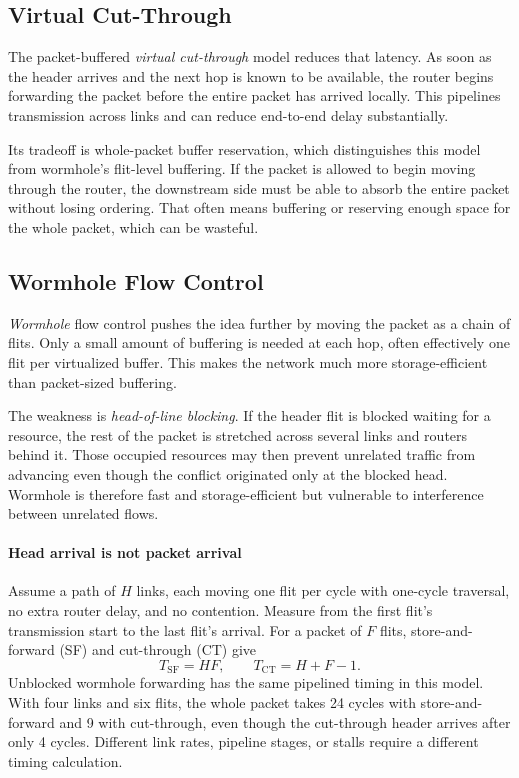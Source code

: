 \subsection{Virtual Cut-Through}\label{subsec:pin-cut-through}
The packet-buffered \textit{virtual cut-through} model reduces that latency.
As soon as the header arrives and the next hop is known to be available, the router begins forwarding the packet before the entire packet has arrived locally.
This pipelines transmission across links and can reduce end-to-end delay substantially.

Its tradeoff is whole-packet buffer reservation, which distinguishes this model from wormhole's flit-level buffering.
If the packet is allowed to begin moving through the router, the downstream side must be able to absorb the entire packet without losing ordering.
That often means buffering or reserving enough space for the whole packet, which can be wasteful.

\subsection{Wormhole Flow Control}\label{subsec:pin-wormhole}
\textit{Wormhole} flow control pushes the idea further by moving the packet as a chain of flits.
Only a small amount of buffering is needed at each hop, often effectively one flit per virtualized buffer.
This makes the network much more storage-efficient than packet-sized buffering.

The weakness is \textit{head-of-line blocking}.
If the header flit is blocked waiting for a resource, the rest of the packet is stretched across several links and routers behind it.
Those occupied resources may then prevent unrelated traffic from advancing even though the conflict originated only at the blocked head.
Wormhole is therefore fast and storage-efficient but vulnerable to interference between unrelated flows.

\paragraph{Head arrival is not packet arrival}
Assume a path of $H$ links, each moving one flit per cycle with one-cycle traversal, no extra router delay, and no contention.
Measure from the first flit's transmission start to the last flit's arrival.
For a packet of $F$ flits, store-and-forward (SF) and cut-through (CT) give
\begin{equation}\label{eq:network-packet-latency}
    T_{\mathrm{SF}}=HF,\qquad T_{\mathrm{CT}}=H+F-1.
\end{equation}
Unblocked wormhole forwarding has the same pipelined timing in this model.
With four links and six flits, the whole packet takes 24 cycles with store-and-forward and 9 with cut-through, even though the cut-through header arrives after only 4 cycles.
Different link rates, pipeline stages, or stalls require a different timing calculation.

